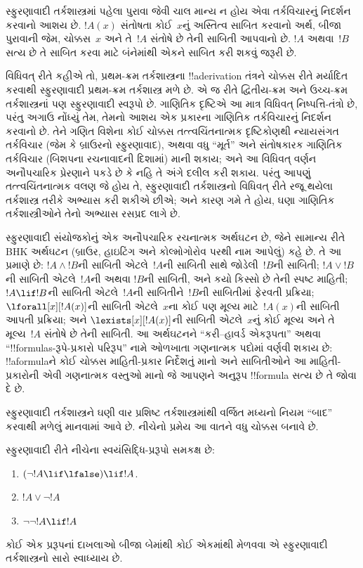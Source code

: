 \documentclass[../../../include/open-logic-section]{subfiles}
\begin{document}
સ્ફુરણાવાદી તર્કશાસ્ત્રમાં પહેલા પુરાવા જેવી ચાલ માન્ય ન હોય એવા
તર્કવિચારનું નિદર્શન કરવાનો આશય છે. $!A(x)$ સંતોષતા કોઈ~$x$નું
અસ્તિત્વ સાબિત કરવાનો અર્થ, બીજા પુરાવાની જેમ, ચોક્કસ~$x$ અને તે~$!A$
સંતોષે છે તેની સાબિતી આપવાનો છે. $!A$ અથવા~$!B$ સત્ય છે તે સાબિત કરવા
માટે બંનેમાંથી એકને સાબિત કરી શકવું જરૂરી છે.

વિધિવત્ રીતે કહીએ તો, પ્રથમ-ક્રમ તર્કશાસ્ત્રના !!a{derivation} તંત્રને
ચોક્કસ રીતે મર્યાદિત કરવાથી સ્ફુરણાવાદી પ્રથમ-ક્રમ તર્કશાસ્ત્ર મળે છે.
એ જ રીતે દ્વિતીય-ક્રમ અને ઉચ્ચ-ક્રમ તર્કશાસ્ત્રનાં પણ સ્ફુરણાવાદી
સ્વરૂપો છે. ગાણિતિક દૃષ્ટિએ આ માત્ર વિધિવત્ નિષ્પત્તિ-તંત્રો છે, પરંતુ
અગાઉ નોંધ્યું તેમ, તેમનો આશય એક પ્રકારના ગાણિતિક તર્કવિચારનું નિદર્શન
કરવાનો છે. તેને ગણિત વિશેના કોઈ ચોક્કસ તત્ત્વચિંતનાત્મક દૃષ્ટિકોણથી
ન્યાયસંગત તર્કવિચાર (જેમ કે બ્રાઉરનો સ્ફુરણાવાદ), અથવા વધુ ``મૂર્ત''
અને સંતોષકારક ગાણિતિક તર્કવિચાર (બિશપના રચનાવાદની દિશામાં) માની શકાય;
અને આ વિધિવત્ વર્ણન અનૌપચારિક પ્રેરણાને પકડે છે કે નહિ તે અંગે દલીલ
કરી શકાય. પરંતુ આપણું તત્ત્વચિંતનાત્મક વલણ જે હોય તે, સ્ફુરણાવાદી
તર્કશાસ્ત્રનો વિધિવત્ રીતે રજૂ થયેલા તર્કશાસ્ત્ર તરીકે અભ્યાસ કરી
શકીએ છીએ; અને કારણ ગમે તે હોય, ઘણા ગાણિતિક તર્કશાસ્ત્રીઓને તેનો
અભ્યાસ રસપ્રદ લાગે છે.

સ્ફુરણાવાદી સંયોજકોનું એક અનૌપચારિક રચનાત્મક અર્થઘટન છે, જેને સામાન્ય
રીતે BHK અર્થઘટન (બ્રાઉર, હાઇટિંગ અને કોલ્મોગોરોવ પરથી નામ આપેલું)
કહે છે. તે આ પ્રમાણે છે: $!A \land !B$ની સાબિતી એટલે~$!A$ની સાબિતી
સાથે જોડેલી~$!B$ની સાબિતી; $!A \lor !B$ની સાબિતી એટલે~$!A$ની અથવા
$!B$ની સાબિતી, અને કયો કિસ્સો છે તેની સ્પષ્ટ માહિતી; $!A \lif !B$ની
સાબિતી એટલે~$!A$ની સાબિતીને~$!B$ની સાબિતીમાં ફેરવતી પ્રક્રિયા;
$\lforall[x][!A(x)]$ની સાબિતી એટલે~$x$ના કોઈ પણ મૂલ્ય માટે~$!A(x)$ની
સાબિતી આપતી પ્રક્રિયા; અને $\lexists[x][!A(x)]$ની સાબિતી એટલે~$x$નું
કોઈ મૂલ્ય અને તે મૂલ્ય~$!A$ સંતોષે છે તેની સાબિતી. આ અર્થઘટનને
``કરી--હાવર્ડ એકરૂપતા'' અથવા ``!!{formula}s-રૂપે-પ્રકારો પરિરૂપ'' નામે
ઓળખાતા ગણનાત્મક પદોમાં વર્ણવી શકાય છે: !!a{formula}ને કોઈ ચોક્કસ
માહિતી-પ્રકાર નિર્દેશતું માનો અને સાબિતીઓને આ માહિતી-પ્રકારોની એવી
ગણનાત્મક વસ્તુઓ માનો જે આપણને અનુરૂપ !!{formula} સત્ય છે તે જોવા દે છે.

સ્ફુરણાવાદી તર્કશાસ્ત્રને ઘણી વાર પ્રશિષ્ટ તર્કશાસ્ત્રમાંથી વર્જિત
મધ્યનો નિયમ ``બાદ'' કરવાથી મળેલું માનવામાં આવે છે. નીચેનો પ્રમેય આ
વાતને વધુ ચોક્કસ બનાવે છે.
\begin{thm}
સ્ફુરણાવાદી રીતે નીચેના સ્વયંસિદ્ધિ-પ્રરૂપો સમકક્ષ છે:
\begin{enumerate}
\item $(\lnot !A \lif \lfalse) \lif !A$.
\item $!A \lor \lnot !A$
\item $\lnot \lnot !A \lif !A$
\end{enumerate}
\end{thm}
કોઈ એક પ્રરૂપનાં દાખલાઓ બીજા બેમાંથી કોઈ એકમાંથી મેળવવા એ સ્ફુરણાવાદી
તર્કશાસ્ત્રનો સારો સ્વાધ્યાય છે.
\end{document}
